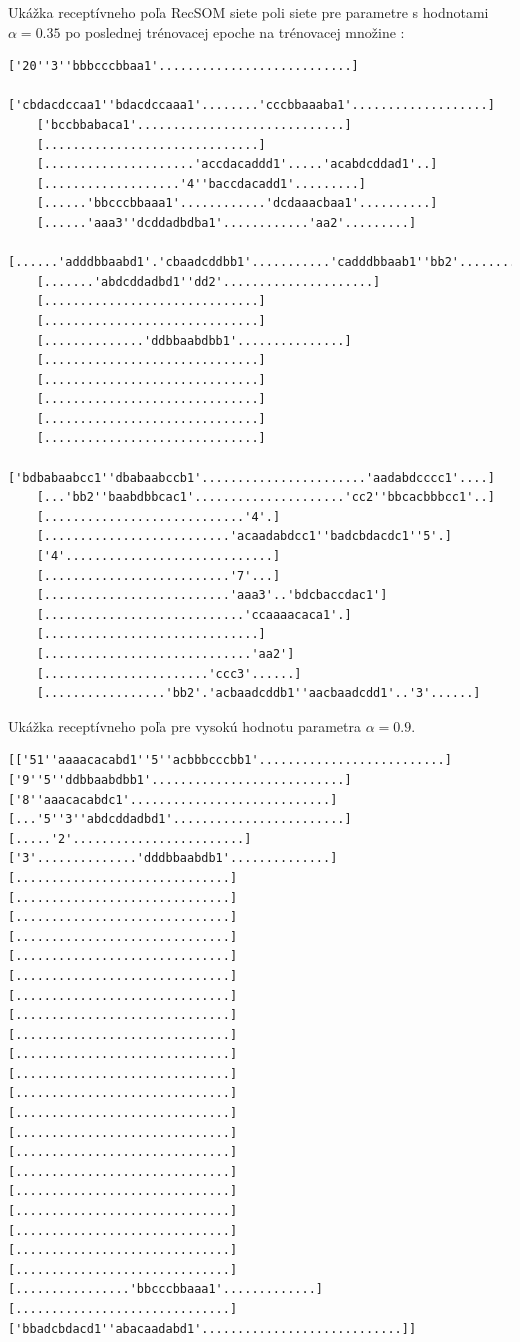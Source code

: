 Ukážka receptívneho poľa RecSOM siete poli siete pre parametre s hodnotami $\alpha = 0.35$ po poslednej trénovacej epoche na trénovacej množine :

\begin{lstlisting}[basicstyle=\footnotesize]
    ['20''3''bbbcccbbaa1'...........................]
    ['cbdacdccaa1''bdacdccaaa1'........'cccbbaaaba1'...................]
    ['bccbbabaca1'.............................]
    [..............................]
    [.....................'accdacaddd1'.....'acabdcddad1'..]
    [...................'4''baccdacadd1'.........]
    [......'bbcccbbaaa1'............'dcdaaacbaa1'..........]
    [......'aaa3''dcddadbdba1'............'aa2'.........]
    [......'adddbbaabd1'.'cbaadcddbb1'...........'cadddbbaab1''bb2'........]
    [.......'abdcddadbd1''dd2'.....................]
    [..............................]
    [..............................]
    [..............'ddbbaabdbb1'...............]
    [..............................]
    [..............................]
    [..............................]
    [..............................]
    [..............................]
    ['bdbabaabcc1''dbabaabccb1'.......................'aadabdcccc1'....]
    [...'bb2''baabdbbcac1'.....................'cc2''bbcacbbbcc1'..]
    [............................'4'.]
    [..........................'acaadabdcc1''badcbdacdc1''5'.]
    ['4'.............................]
    [..........................'7'...]
    [..........................'aaa3'..'bdcbaccdac1']
    [............................'ccaaaacaca1'.]
    [..............................]
    [.............................'aa2']
    [.......................'ccc3'......]
    [.................'bb2'.'acbaadcddb1''aacbaadcdd1'..'3'......]
\end{lstlisting}

Ukážka receptívneho poľa pre vysokú hodnotu parametra $\alpha = 0.9$.


\begin{lstlisting}[basicstyle=\footnotesize]
    [['51''aaaacacabd1''5''acbbbcccbb1'..........................]
['9''5''ddbbaabdbb1'...........................]
['8''aaacacabdc1'............................]
[...'5''3''abdcddadbd1'........................]
[.....'2'........................]
['3'..............'dddbbaabdb1'..............]
[..............................]
[..............................]
[..............................]
[..............................]
[..............................]
[..............................]
[..............................]
[..............................]
[..............................]
[..............................]
[..............................]
[..............................]
[..............................]
[..............................]
[..............................]
[..............................]
[..............................]
[..............................]
[..............................]
[..............................]
[..............................]
[................'bbcccbbaaa1'.............]
[..............................]
['bbadcbdacd1''abacaadabd1'............................]]
\end{lstlisting}


